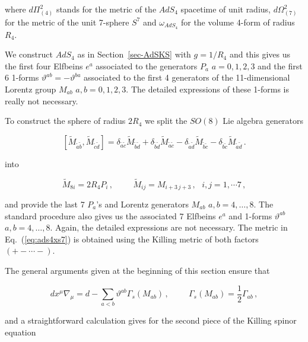 \documentclass[12pt,a4paper]{article}
\begin{document}
\noindent 
where $d\Pi_{(4)}^{2}$ stands for the metric of the $AdS_{4}$
spacetime of unit radius, $d\Omega_{(7)}^{2}$ for the metric of the
unit 7-sphere $S^{7}$ and $\omega_{AdS_{4}}$ for the volume 4-form of
radius $R_{4}$.

We construct $AdS_{4}$ as in Section~\ref{sec-AdSKS} with $g=1/R_{4}$
and this gives us the first four Elfbeins $e^{a}$ associated to the
generators $P_{a}$ $a=0,1,2,3$ and the first 6 1-forms
$\vartheta^{ab}= -\vartheta^{ba}$ associated to the first 4 generators
of the 11-dimensional Lorentz group $M_{ab}$ $a,b=0,1,2,3$. The
detailed expressions of these 1-forms is really not necessary.

To construct the sphere of radius $2R_{4}$ we split the $SO(8)$ Lie
algebra generators

\begin{equation}
\label{eq:Salgebra}
\left[\tilde{M}_{\tilde{a}\tilde{b}},\tilde{M}_{\tilde{c}\tilde{d}} \right]  =
\delta_{\tilde{a}\tilde{c}} \tilde{M}_{\tilde{b}\tilde{d}} 
+\delta_{\tilde{b}\tilde{d}} \tilde{M}_{\tilde{a}\tilde{c}}
-\delta_{\tilde{a}\tilde{d}} \tilde{M}_{\tilde{b}\tilde{c}} 
-\delta_{\tilde{b}\tilde{c}} \tilde{M}_{\tilde{a}\tilde{d}}\, .
\end{equation}

\noindent
into 

\begin{equation}
\tilde{M}_{8i}= 2R_{4}P_{i}\, ,
\hspace{1cm} 
\tilde{M}_{ij}=M_{i+3\, j+3}\, ,
\,\,\,\, i,j=1,\cdots 7\, , 
\end{equation}

\noindent 
and provide the last 7 $P_{a}$'s and Lorentz generators $M_{ab}$
$a,b=4,\dots,8$. The standard procedure also gives us the associated 7
Elfbeins $e^{a}$ and 1-forms $\vartheta^{ab}$ $a,b=4,\dots,8$. Again,
the detailed expressions are not necessary. The metric in
Eq.~(\ref{eq:ads4xs7}) is obtained using the Killing metric of both
factors $(+-\cdots -)$.

The general arguments given at the beginning of this section ensure that

\begin{equation}
dx^{\mu}\nabla_{\mu} = d - \sum_{a<b}\vartheta^{ab}\Gamma_{s}(M_{ab})\, ,  
\hspace{1cm}
\Gamma_{s}(M_{ab}) ={\textstyle\frac{1}{2}}\Gamma_{ab}\, ,
\end{equation}

\noindent
and a straightforward calculation gives for the second piece
of the Killing spinor equation
\end{document}
